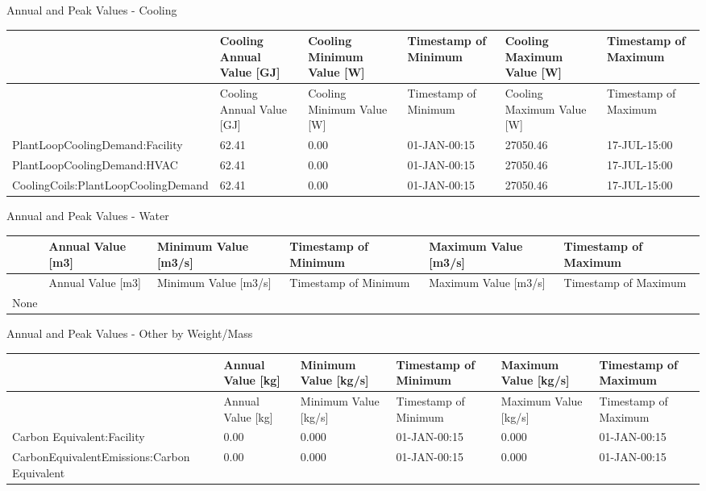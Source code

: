 Annual and Peak Values - Cooling

{\scriptsize
\begin{longtable}[c]{>{\raggedright}p{1.0in}>{\raggedright}p{1.0in}>{\raggedright}p{1.0in}>{\raggedright}p{1.0in}>{\raggedright}p{1.0in}>{\raggedright}p{1.0in}}
\toprule 
 & Cooling Annual Value [GJ] & Cooling Minimum Value [W] & Timestamp of Minimum & Cooling Maximum Value [W] & Timestamp of Maximum \tabularnewline
\midrule
\endfirsthead

\toprule 
 & Cooling Annual Value [GJ] & Cooling Minimum Value [W] & Timestamp of Minimum & Cooling Maximum Value [W] & Timestamp of Maximum \tabularnewline
\midrule
\endhead

PlantLoopCoolingDemand\-:Facility & 62.41 & 0.00 & 01-JAN-00\-:15 & 27050.46 & 17-JUL-15\-:00 \tabularnewline
PlantLoopCoolingDemand\-:HVAC & 62.41 & 0.00 & 01-JAN-00\-:15 & 27050.46 & 17-JUL-15\-:00 \tabularnewline
CoolingCoils\-:PlantLoopCoolingDemand & 62.41 & 0.00 & 01-JAN-00\-:15 & 27050.46 & 17-JUL-15\-:00 \tabularnewline
\bottomrule
\end{longtable}}

Annual and Peak Values - Water

\begin{longtable}[c]{>{\raggedright}p{1.0in}>{\raggedright}p{1.0in}>{\raggedright}p{1.0in}>{\raggedright}p{1.0in}>{\raggedright}p{1.0in}>{\raggedright}p{1.0in}}
\toprule 
 & Annual Value [m3] & Minimum Value [m3/s] & Timestamp of Minimum & Maximum Value [m3/s] & Timestamp of Maximum \tabularnewline
\midrule
\endfirsthead

\toprule 
 & Annual Value [m3] & Minimum Value [m3/s] & Timestamp of Minimum & Maximum Value [m3/s] & Timestamp of Maximum \tabularnewline
\midrule
\endhead

None & ~ & ~ & ~ & ~ & ~ \tabularnewline
\bottomrule
\end{longtable}

Annual and Peak Values - Other by Weight/Mass

{\scriptsize
\begin{longtable}[c]{>{\raggedright}p{1.0in}>{\raggedright}p{1.0in}>{\raggedright}p{1.0in}>{\raggedright}p{1.0in}>{\raggedright}p{1.0in}>{\raggedright}p{1.0in}}
  \toprule 
  & Annual Value [kg] & Minimum Value [kg/s] & Timestamp of Minimum & Maximum Value [kg/s] & Timestamp of Maximum \tabularnewline
  \midrule
  \endfirsthead

  \toprule 
  & Annual Value [kg] & Minimum Value [kg/s] & Timestamp of Minimum & Maximum Value [kg/s] & Timestamp of Maximum \tabularnewline
  \midrule
  \endhead

  Carbon Equivalent\-:Facility & 0.00 & 0.000 & 01-JAN-00\-:15 & 0.000 & 01-JAN-00\-:15 \tabularnewline
  Carbon\-Equivalent\-Emissions\-:Carbon Equivalent & 0.00 & 0.000 & 01-JAN-00\-:15 & 0.000 & 01-JAN-00\-:15 \tabularnewline
  \bottomrule
\end{longtable}}

